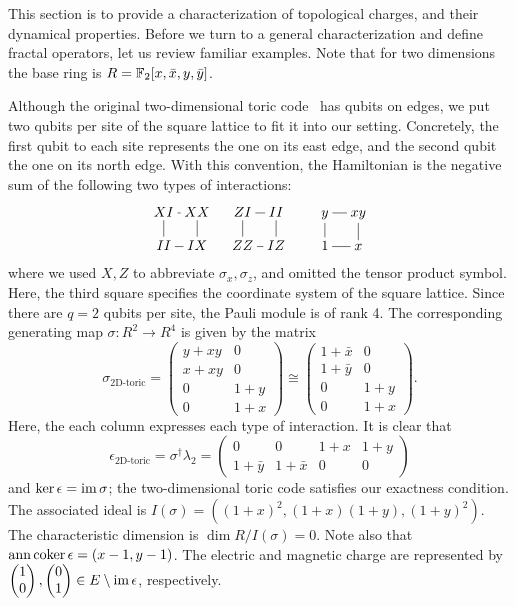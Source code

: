 This section is to provide a characterization of topological charges,
and their dynamical properties.
Before we turn to a general characterization and define fractal operators,
let us review familiar examples.
Note that for two dimensions the base ring is $R = \mathbb{F}_2[x,\bar x, y, \bar y]$.

\begin{example}
\label{eg:2d-toric}
Although the original two-dimensional toric code~\cite{Kitaev2003Fault-tolerant}
has qubits on edges,
we put two qubits per site of the square lattice to fit it into our setting.
Concretely, the first qubit to each site represents the one on its east edge,
and the second qubit the one on its north edge. With this convention,
the Hamiltonian is the negative sum of the following two types of interactions:
\[
\xymatrix@!0{
XI \ar@{-}[r] & XX \ar@{-}[d] \\
II \ar@{-}[u] & IX \ar@{-}[l]
} \quad
\xymatrix@!0{
ZI \ar@{-}[r] & II \ar@{-}[d] \\
ZZ \ar@{-}[u] & IZ \ar@{-}[l]
} \quad \quad
\xymatrix@!0{
y \ar@{-}[r] & xy \ar@{-}[d] \\
1 \ar@{-}[u] & x \ar@{-}[l]
}
\]
where we used $X,Z$ to abbreviate $\sigma_x,\sigma_z$, and omitted the tensor product symbol.
Here, the third square specifies the coordinate system of the square lattice.
Since there are $q=2$ qubits per site, the Pauli module is of rank 4.
The corresponding generating map $\sigma : R^2 \to R^4$ is given by the matrix
\[
 \sigma_{\text{2D-toric}} = 
\begin{pmatrix}
 y+xy & 0 \\
 x+xy & 0 \\
\hline
 0    & 1 + y \\
 0    & 1 + x
\end{pmatrix}
\cong
\begin{pmatrix}
 1 + \bar x & 0 \\
 1 + \bar y & 0 \\
\hline
 0          & 1 + y \\
 0          & 1 + x
\end{pmatrix} .
\]
Here, the each column expresses each type of interaction.
It is clear that
\[
\epsilon_{\text{2D-toric}} = \sigma^\dagger \lambda_2 =
\begin{pmatrix}
 0         & 0         & 1 + x & 1 + y \\
 1+ \bar y & 1+ \bar x & 0     & 0
\end{pmatrix}
\]
and $\ker \epsilon = \mathop{\mathrm{im}}\nolimits \sigma$;
the two-dimensional toric code satisfies our exactness condition.
The associated ideal is $I(\sigma) = ( (1+x)^2, (1+x)(1+y), (1+y)^2 )$.
The characteristic dimension is $\dim R / I(\sigma) = 0$.
Note also that $\mathop{\mathrm{ann}}\nolimits \mathop{\mathrm{coker}}\nolimits \epsilon = (x-1,y-1)$.
The electric and magnetic charge are represented by
$\begin{pmatrix} 1 \\ 0 \end{pmatrix}, \begin{pmatrix} 0 \\ 1 \end{pmatrix} \in E \setminus \mathop{\mathrm{im}}\nolimits \epsilon$,
respectively.



\end{example}
